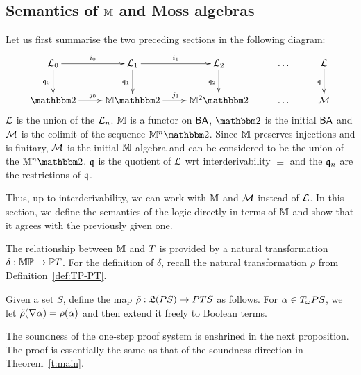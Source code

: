 \documentclass{book}
\begin{document}
\subsection{Semantics of $\mathbb{M}$ and Moss algebras}
\label{sec:semantics-of-M}
Let us first summarise the two preceding sections in the following diagram:
\begin{equation*}
\xymatrix{
\xxviLang_0 \ar[r]^{i_0}\ar[d]_{\xxviquo_0} & 
\xxviLang_1\ar[d]_{\xxviquo_1} \ar[r]^{i_1} & 
\xxviLang_2 \ar[d]_{\xxviquo_2} & \ldots & 
\xxviLang \ar[d]_{\xxviquo}\\ 
%
\xxvibbtwo \ar[r]^{j_0} & 
\xxviM\xxvibbtwo \ar[r]^{j_1} & 
\xxviM^2\xxvibbtwo & \ldots & 
\xxviLTM \\ 
}
\end{equation*}
$\mathcal{L}$ is the union of the $\mathcal{L}_n$. $\mathbb{M}$ is a functor on $\mathsf{BA}$,
$\xxvibbtwo$ is the initial $\mathsf{BA}$ and $\mathcal{M}$ is the colimit of the
sequence $\xxviM^n\xxvibbtwo$. Since $\mathbb{M}$ preserves injections and is
finitary, $\mathcal{M}$ is the initial $\mathbb{M}$-algebra and can be considered to
be the union of the $\xxviM^n\xxvibbtwo$. $\mathfrak{q}$ is the quotient of $\mathcal{L}$
wrt interderivability $\equiv$ and the $\mathfrak{q}_n$ are the restrictions
of $\mathfrak{q}$.

Thus, up to interderivability, we can work with $\mathbb{M}$ and $\mathcal{M}$
instead of $\mathcal{L}$.  In this section, we define the semantics of the
logic directly in terms of $\mathbb{M}$ and show that it agrees with the
previously given one.

The relationship between $\mathbb{M}$ and $T$ is provided by a natural
transformation $\delta: \mathbb{M}\mathbb{P} \to \mathbb{P}T$.  For the definition of
$\delta$, recall the natural transformation $\rho$ from
Definition~\ref{def:TP-PT}.

\begin{definition}
Given a set $S$, define the map $\tilde{\rho}: \mathfrak{L}(P S) \to
PT S$ as follows. 
For $\alpha \in T_{\omega} P S$, we let
$\tilde\rho(\nabla\alpha)=\rho(\alpha)$ and then extend it freely to
Boolean terms.
\end{definition}

\noindent
The soundness of the one-step proof system is enshrined in the next
proposition.  The proof is essentially the same as that of the
soundness direction in Theorem~\ref{t:main}.
\end{document}
